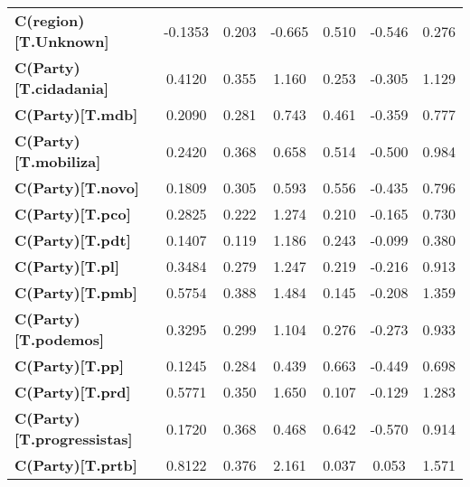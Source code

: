 \begin{center}
\begin{tabular}{lcccccc}
\textbf{C(region)[T.Unknown]}      &      -0.1353  &        0.203     &    -0.665  &         0.510        &       -0.546    &        0.276     \\
\textbf{C(Party)[T.cidadania]}     &       0.4120  &        0.355     &     1.160  &         0.253        &       -0.305    &        1.129     \\
\textbf{C(Party)[T.mdb]}           &       0.2090  &        0.281     &     0.743  &         0.461        &       -0.359    &        0.777     \\
\textbf{C(Party)[T.mobiliza]}      &       0.2420  &        0.368     &     0.658  &         0.514        &       -0.500    &        0.984     \\
\textbf{C(Party)[T.novo]}          &       0.1809  &        0.305     &     0.593  &         0.556        &       -0.435    &        0.796     \\
\textbf{C(Party)[T.pco]}           &       0.2825  &        0.222     &     1.274  &         0.210        &       -0.165    &        0.730     \\
\textbf{C(Party)[T.pdt]}           &       0.1407  &        0.119     &     1.186  &         0.243        &       -0.099    &        0.380     \\
\textbf{C(Party)[T.pl]}            &       0.3484  &        0.279     &     1.247  &         0.219        &       -0.216    &        0.913     \\
\textbf{C(Party)[T.pmb]}           &       0.5754  &        0.388     &     1.484  &         0.145        &       -0.208    &        1.359     \\
\textbf{C(Party)[T.podemos]}       &       0.3295  &        0.299     &     1.104  &         0.276        &       -0.273    &        0.933     \\
\textbf{C(Party)[T.pp]}            &       0.1245  &        0.284     &     0.439  &         0.663        &       -0.449    &        0.698     \\
\textbf{C(Party)[T.prd]}           &       0.5771  &        0.350     &     1.650  &         0.107        &       -0.129    &        1.283     \\
\textbf{C(Party)[T.progressistas]} &       0.1720  &        0.368     &     0.468  &         0.642        &       -0.570    &        0.914     \\
\textbf{C(Party)[T.prtb]}          &       0.8122  &        0.376     &     2.161  &         0.037        &        0.053    &        1.571     \\

\end{tabular}
\end{center}

